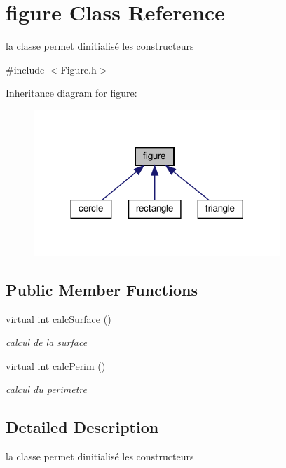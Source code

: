 \hypertarget{classfigure}{}\section{figure Class Reference}
\label{classfigure}


la classe permet d\textquotesingle{}initialisé les constructeurs  




{\ttfamily \#include $<$Figure.\+h$>$}



Inheritance diagram for figure\+:
\nopagebreak
\begin{figure}[H]
\begin{center}
\leavevmode
\includegraphics[width=264pt]{classfigure__inherit__graph}
\end{center}
\end{figure}
\subsection*{Public Member Functions}
\begin{DoxyCompactItemize}
\item 
virtual int \hyperlink{classfigure_a168accd9182dbbef2a580c5e1c34d12e}{calc\+Surface} ()
\begin{DoxyCompactList}\small\item\em calcul de la surface \end{DoxyCompactList}\item 
virtual int \hyperlink{classfigure_afc1d57fa737d39192a0c00125c4cda19}{calc\+Perim} ()
\begin{DoxyCompactList}\small\item\em calcul du perimetre \end{DoxyCompactList}\end{DoxyCompactItemize}


\subsection{Detailed Description}
la classe permet d\textquotesingle{}initialisé les constructeurs 

